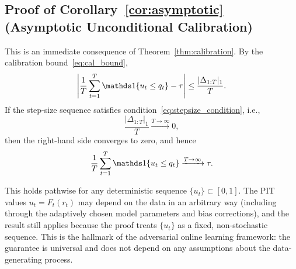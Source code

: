 \subsection{Proof of Corollary~\ref{cor:asymptotic} (Asymptotic Unconditional Calibration)}\label{proof:asymptotic}

This is an immediate consequence of Theorem~\ref{thm:calibration}. By the calibration bound~\eqref{eq:cal_bound},
\begin{equation}
    \left|\frac{1}{T}\sum_{t=1}^{T}\ind\{u_t \leq q_t\} - \tau\right| \leq \frac{|\Delta_{1:T}|_1}{T}.
\end{equation}
If the step-size sequence satisfies condition~\eqref{eq:stepsize_condition}, i.e.,
\begin{equation}
    \frac{|\Delta_{1:T}|_1}{T} \xrightarrow{T \to \infty} 0,
\end{equation}
then the right-hand side converges to zero, and hence
\begin{equation}
    \frac{1}{T}\sum_{t=1}^{T}\ind\{u_t \leq q_t\} \xrightarrow{T \to \infty} \tau.
\end{equation}

This holds pathwise for any deterministic sequence $\{u_t\} \subset [0,1]$. The PIT values $u_t = F_t(r_t)$ may depend on the data in an arbitrary way (including through the adaptively chosen model parameters and bias corrections), and the result still applies because the proof treats $\{u_t\}$ as a fixed, non-stochastic sequence. This is the hallmark of the adversarial online learning framework: the guarantee is universal and does not depend on any assumptions about the data-generating process.

